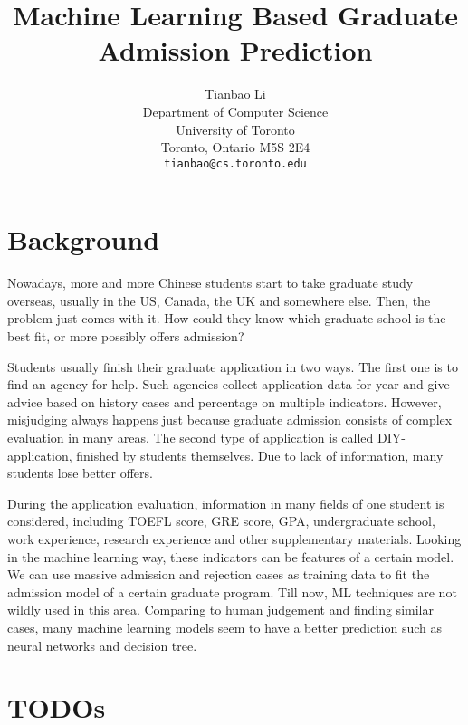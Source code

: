 \documentclass{article}
\title{Machine Learning Based Graduate Admission Prediction}
\author{
  Tianbao Li\\
  Department of Computer Science\\
  University of Toronto\\
  Toronto, Ontario M5S 2E4\\
  \texttt{tianbao@cs.toronto.edu} \\
}
\begin{document}

\maketitle


\section{Background}

Nowadays, more and more Chinese students start to take graduate study overseas, usually in the US, Canada, the UK and somewhere else. Then, the problem just comes with it. How could they know which graduate school is the best fit, or more possibly offers admission?

Students usually finish their graduate application in two ways. The first one is to find an agency for help. Such agencies collect application data for year and give advice based on history cases and percentage on multiple indicators. However, misjudging always happens just because graduate admission consists of complex evaluation in many areas. The second type of application is called DIY-application, finished by students themselves. Due to lack of information, many students lose better offers.

During the application evaluation, information in many fields of one student is considered, including TOEFL score, GRE score, GPA, undergraduate school, work experience, research experience and other supplementary materials. Looking in the machine learning way, these indicators can be features of a certain model. We can use massive admission and rejection cases as training data to fit the admission model of a certain graduate program. Till now, ML techniques are not wildly used in this area. Comparing to human judgement and finding similar cases, many machine learning models seem to have a better prediction such as neural networks and decision tree.

\section{TODOs}
\end{document}
